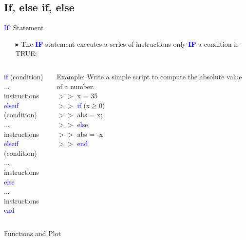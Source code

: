 \documentclass[xcolor={dvipsnames,rgb}, aspectratio=169]{beamer}
\begin{document}
\subsection{If, else if, else}
\begin{frame}{\textcolor{blue}{IF} Statement}
\begin{itemize}
   \item[$\blacktriangleright$] The \textcolor{blue}{\textbf{IF}} statement executes a
      series of instructions only \textcolor{blue}{\textbf{IF}} a condition is TRUE:
\end{itemize}

\begin{columns}
   \begin{tcolorbox}[colback=white,colframe=bluepoli]
      \textcolor{blue}{if} (condition)\\
      ... instructions\\
      \textcolor{blue}{elseif} (condition)\\
      ... instructions \\
      \textcolor{blue}{elseif} (condition)\\
      ... instructions \\
      \textcolor{blue}{else}\\
      ... instructions \\
      \textcolor{blue}{end}
   \end{tcolorbox}
   \begin{tcolorbox}[colback=white,colframe=bluepoli]
      \textcolor{mylilas}{Example: Write a simple script to compute the absolute value of
      a number.}\\
      $>>$ x = 35\\
      $>>$ \textcolor{blue}{if} (x$\ge$0)\\
      $>>$ \hspace{1em}abs = x;\\
      $>>$ \textcolor{blue}{else}\\
      $>>$ \hspace{1em}abs = -x\\
      $>>$ \textcolor{blue}{end}
   \end{tcolorbox}
\end{columns}
\end{frame}


{%
\begin{frame}[standout]
   Functions and Plot
\end{frame}
}
\end{document}

